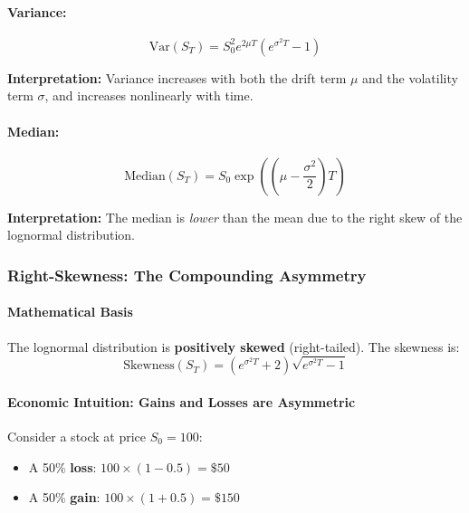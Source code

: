 \documentclass[12pt,a4paper]{article}
\begin{document}
\paragraph{Variance:}
\begin{equation}
\text{Var}(S_T) = S_0^2 e^{2\mu T} \left(e^{\sigma^2 T} - 1\right)
\end{equation}

\textbf{Interpretation:} Variance increases with both the drift term $\mu$ and the volatility term $\sigma$, and increases nonlinearly with time.

\paragraph{Median:}
\begin{equation}
\text{Median}(S_T) = S_0 \exp\left(\left(\mu - \frac{\sigma^2}{2}\right)T\right)
\end{equation}

\textbf{Interpretation:} The median is \textit{lower} than the mean due to the right skew of the lognormal distribution.

\subsubsection{Right-Skewness: The Compounding Asymmetry}

\paragraph{Mathematical Basis}

The lognormal distribution is \textbf{positively skewed} (right-tailed). The skewness is:
\begin{equation}
\text{Skewness}(S_T) = (e^{\sigma^2 T} + 2)\sqrt{e^{\sigma^2 T} - 1}
\end{equation}

\paragraph{Economic Intuition: Gains and Losses are Asymmetric}

Consider a stock at price $S_0 = 100$:
\begin{itemize}
    \item A 50\% \textbf{loss}: $100 \times (1 - 0.5) = \$50$
    \item A 50\% \textbf{gain}: $100 \times (1 + 0.5) = \$150$
\end{itemize}
\end{document}
